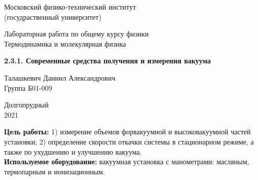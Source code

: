\documentclass[a4paper, 12pt]{article} %
\begin{document}


\begin{titlepage}

	\newpage
	\begin{center}
		\normalsize Московский физико-технический институт \\(госудраственный университет)
	\end{center}

	\vspace{6em}

	\begin{center}
		\Large Лабораторная работа по общему курсу физики\\Термодинамика и молекулярная физика
	\end{center}

	\vspace{1em}

	\begin{center}
		\Large \textbf{2.3.1. Современные средства
получения и измерения вакуума}
	\end{center}

	\vspace{2em}

	\begin{center}
		\large Талашкевич Даниил Александрович\\
		Группа Б01-009
	\end{center}

	\vspace{\fill}

	\begin{center}
		Долгопрудный \\2021
	\end{center}
	
\end{titlepage}



	\thispagestyle{empty}
	\newpage
	\tableofcontents
	\newpage
	\setcounter{page}{1}



\textbf{Цель работы:} 1) измерение объемов форвакуумной и высоковакуумной частей установки; 2) определение скорости откачки системы в стационарном режиме, а также по ухудшению и улучшению вакуума.\\

\textbf{Используемое оборудование:} вакуумная установка с манометрами: масляным, термопарным и ионизационным.
\end{document}
